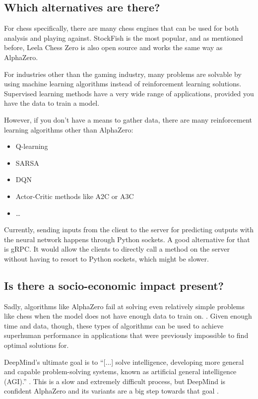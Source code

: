 \documentclass{article}
\begin{document}
\subsection{Which alternatives are there?}

For chess specifically, there are many chess engines that can be used for both analysis
and playing against. StockFish is the most popular, and as mentioned before, 
Leela Chess Zero is also open source and works the same way as AlphaZero. 

For industries other than the gaming industry, many problems are solvable by using
machine learning algorithms instead of reinforcement learning solutions. 
Supervised learning methods have a very wide range of applications, provided 
you have the data to train a model.

However, if you don't have a means to gather data, there are many reinforcement
learning algorithms other than AlphaZero:

\begin{itemize}
    \item Q-learning
    \item SARSA
    \item DQN
    \item Actor-Critic methods like A2C or A3C
    \item \dots
\end{itemize}

Currently, sending inputs from the client to the server for predicting outputs with 
the neural network happens through Python sockets. A good alternative for that is gRPC. 
It would allow the clients to directly call a method on the server without having to 
resort to Python sockets, which might be slower. \cite{IntroductionGRPC}

\subsection{Is there a socio-economic impact present?}

Sadly, algorithms like AlphaZero fail at solving even relatively simple problems like chess when the model 
does not have enough data to train on.  \cite{ThomasMoerlandPostdoc}. 
Given enough time and data, though, these types of algorithms can be used to achieve superhuman
performance in applications that were previously impossible to find optimal solutions for.

DeepMind's ultimate goal is to ``[...] solve intelligence, developing more general and capable 
problem-solving systems, known as artificial general intelligence (AGI).'' \cite{DeepMind}.
This is a slow and extremely difficult process, but DeepMind is confident AlphaZero and 
its variants are a big step towards that goal \cite{AlphaZeroSheddingNew}.
\end{document}
